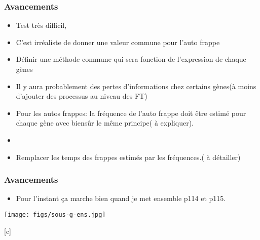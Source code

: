 
\begin{frame}[c]
  \frametitle{Avancements}
 
 
\begin{itemize}
  \item Test très difficil, 
  \item C'est irréaliste de donner une valeur commune pour l'auto frappe
  \item Définir une méthode commune qui sera fonction de l'expression de chaque gènes
  \item Il y aura probablement des pertes d'informations chez certains gènes(à moins d'ajouter des processus au niveau des FT)
\end{itemize}

\begin{itemize}
 \item Pour les autos frappes: la fréquence de l'auto frappe doit être estimé pour chaque gène avec biensûr le même principe( à expliquer).
 \item 
\end{itemize}

\begin{itemize}
 \item Remplacer les temps des frappes estimés par les fréquences.( à détailler)
\end{itemize}



\end{frame}


\begin{frame}[c]
\frametitle{Avancements}
 
\begin{itemize}
 \item  Pour l'instant ça marche bien quand je met ensemble p114 et p115.
\end{itemize}

\begin{center}
  \texttt{[image: figs/sous-g-ens.jpg]}
\end{center}

\end{frame}[c]

